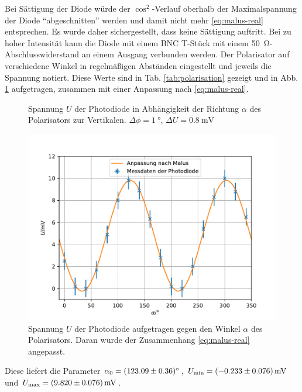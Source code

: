 \documentclass{article}
\newcommand*{\tablePath}{../data} %
\newcommand{\mr}{\mathrm}
\begin{document}
Bei Sättigung der Diode würde der $\cos^2$-Verlauf oberhalb der Maximalspannung der Diode \enquote{abgeschnitten} werden
und damit nicht mehr \eqref{eq:malus-real} entsprechen. Es wurde daher sichergestellt, dass keine Sättigung auftritt.
Bei zu hoher Intensität kann die Diode mit einem BNC T-Stück mit einem \SI{50}{\ohm}-Abschlusswiderstand an einem Ausgang 
verbunden werden.
Der Polarisator auf verschiedene Winkel in regelmäßigen Abständen eingestellt und jeweils die Spannung notiert.
Diese Werte sind in Tab. \ref{tab:polarisation} gezeigt und in Abb. \ref{fig:polarisation} aufgetragen, zusammen
mit einer Anpassung nach \eqref{eq:malus-real}.
\begin{figure}[h]
  \begin{minipage}{0.49\textwidth}
    \centering
    
    \caption{
      Spannung $U$ der Photodiode in Ab\-hängig\-keit der Richtung $\alpha$ des Polarisators zur Vertikalen.
      $\Delta\phi=\SI{1}{\degree}$, $\Delta U = \SI{0.8}{\mV}$
    }
    \label{tab:polarisation}
  \end{minipage}
  \begin{minipage}{0.49\textwidth}
    \centering
    \includegraphics[width=\textwidth]{5.4polarisation}
    \caption{
      Spannung $U$ der Photodiode aufgetragen gegen den Winkel $\alpha$ des Polarisators.
      Daran wurde der Zusammenhang \eqref{eq:malus-real} angepasst.}
    \label{fig:polarisation}
  \end{minipage}
\end{figure}

Diese liefert die Parameter $\alpha_0 = \SI{123.09\pm0.36}{\degree}$,
$U_\mr{min} = \SI{-0.233\pm0.076}{\mV}$ und $U_\mr{max} = \SI{9.82\pm0.076}{\mV}$.
\end{document}
